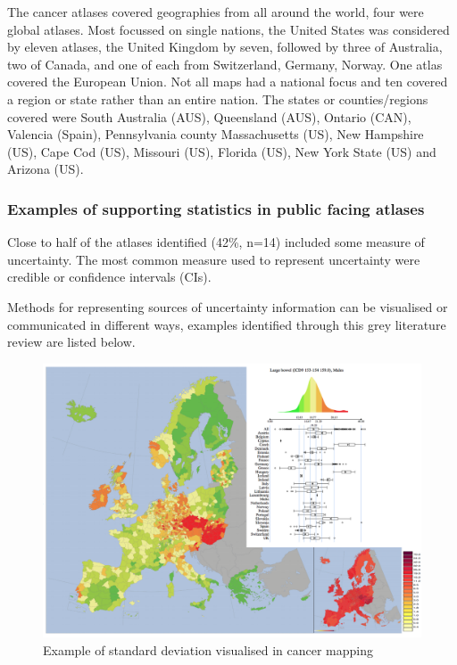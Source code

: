 \documentclass[11pt,]{article}
\begin{document}
The cancer atlases covered geographies from all around the world, four
were global atlases. Most focussed on single nations, the United States
was considered by eleven atlases, the United Kingdom by seven, followed
by three of Australia, two of Canada, and one of each from Switzerland,
Germany, Norway. One atlas covered the European Union. Not all maps had
a national focus and ten covered a region or state rather than an entire
nation. The states or counties/regions covered were South Australia
(AUS), Queensland (AUS), Ontario (CAN), Valencia (Spain), Pennsylvania
county Massachusetts (US), New Hampshire (US), Cape Cod (US), Missouri
(US), Florida (US), New York State (US) and Arizona (US).

\hypertarget{examples-of-supporting-statistics-in-public-facing-atlases}{%
\subsubsection{Examples of supporting statistics in public facing
atlases}\label{examples-of-supporting-statistics-in-public-facing-atlases}}

Close to half of the atlases identified (42\%, n=14) included some
measure of uncertainty. The most common measure used to represent
uncertainty were credible or confidence intervals (CIs).

Methods for representing sources of uncertainty information can be
visualised or communicated in different ways, examples identified
through this grey literature review are listed below.

\begin{figure}

{\centering \includegraphics[width=0.9\linewidth]{figures/standard_deviation_large} 

}

\caption{Example of standard deviation visualised in cancer mapping}\label{fig:stndvn-example}
\end{figure}
\end{document}

